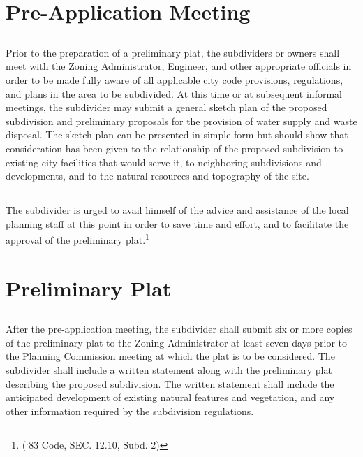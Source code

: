 \section{Pre-Application Meeting}
\subsection{}
Prior to the preparation of a preliminary plat, the subdividers or owners shall meet with the Zoning Administrator, Engineer, and other appropriate officials in order to be made fully aware of all applicable city code provisions, regulations, and plans in the area to be subdivided. At this time or at subsequent informal meetings, the subdivider may submit a general sketch plan of the proposed subdivision and preliminary proposals for the provision of water supply and waste disposal. The sketch plan can be presented in simple form but should show that consideration has been given to the relationship of the proposed subdivision to existing city facilities that would serve it, to neighboring subdivisions and developments, and to the natural resources and topography of the site.
\subsection{}
The subdivider is urged to avail himself of the advice and assistance of the local planning staff at this point in order to save time and effort, and to facilitate the approval of the preliminary plat.\footnote{(‘83 Code, SEC. 12.10, Subd. 2)}

\section{Preliminary Plat}
\subsection{}
After the pre-application meeting, the subdivider shall submit six or more copies of the preliminary plat to the Zoning Administrator at least seven days prior to the Planning Commission meeting at which the plat is to be considered. The subdivider shall include a written statement along with the preliminary plat describing the proposed subdivision. The written statement shall include the anticipated development of existing natural features and vegetation, and any other information required by the subdivision regulations.
